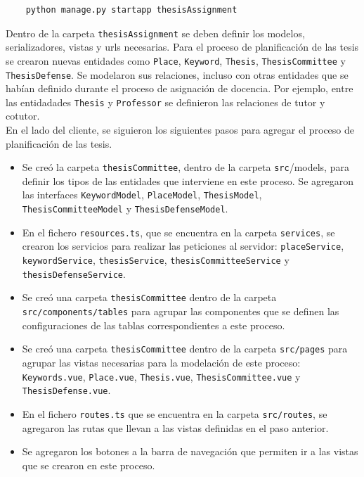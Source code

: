 \begin{verbatim}
    python manage.py startapp thesisAssignment
\end{verbatim}

Dentro de la carpeta \texttt{thesisAssignment} se deben definir los modelos, serializadores, 
vistas y urls necesarias. Para el proceso de planificación de las tesis se crearon nuevas 
entidades como \texttt{Place}, \texttt{Keyword}, \texttt{Thesis}, \texttt{ThesisCommittee} y \texttt{ThesisDefense}. 
Se modelaron sus relaciones, incluso con otras entidades que se habían definido durante el proceso de asignación de 
docencia. Por ejemplo, entre las entidadades \texttt{Thesis} y \texttt{Professor} se definieron las relaciones de tutor y cotutor. \\


En el lado del cliente, se siguieron los siguientes pasos para agregar el proceso 
de planificación de las tesis. 

\begin{itemize}
    \item Se creó la carpeta \texttt{thesisCommittee}, dentro de la carpeta \texttt{src}/models, para 
    definir los tipos de las entidades que interviene en este proceso. Se agregaron las interfaces 
    \texttt{KeywordModel}, \texttt{PlaceModel}, \texttt{ThesisModel}, \texttt{ThesisCommitteeModel} y \texttt{ThesisDefenseModel}.
    \item En el fichero \texttt{resources.ts}, que se encuentra en la carpeta \texttt{services}, se crearon los servicios 
    para realizar las peticiones al servidor:
    \texttt{placeService}, \texttt{keywordService}, \texttt{thesisService}, \texttt{thesisCommitteeService} y \texttt{thesisDefenseService}.
    \item Se creó una carpeta \texttt{thesisCommittee} dentro de la carpeta \texttt{src/components/tables} para agrupar 
    las componentes que se definen las configuraciones de las tablas correspondientes 
    a este proceso.
    \item Se creó una carpeta \texttt{thesisCommittee} dentro de la carpeta \texttt{src/pages} para agrupar 
    las vistas necesarias para la modelación de este proceso: \texttt{Keywords.vue}, \texttt{Place.vue}, 
    \texttt{Thesis.vue}, \texttt{ThesisCommittee.vue} y \texttt{ThesisDefense.vue}.
    \item En el fichero \texttt{routes.ts} que se encuentra en la carpeta \texttt{src/routes}, 
    se agregaron las rutas que llevan a las vistas definidas en el paso anterior.
    \item Se agregaron los botones a la barra de navegación que permiten ir a las vistas que se crearon 
    en este proceso.
\end{itemize}


